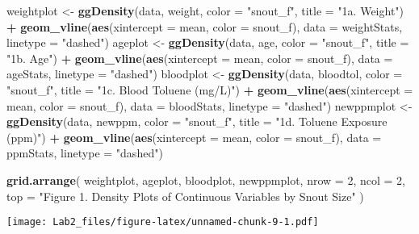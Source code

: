 \documentclass[
]{article}
\newenvironment{Shaded}{\begin{snugshade}}{\end{snugshade}}
\newcommand{\AttributeTok}[1]{\textcolor[rgb]{0.13,0.29,0.53}{#1}}
\newcommand{\DecValTok}[1]{\textcolor[rgb]{0.00,0.00,0.81}{#1}}
\newcommand{\FunctionTok}[1]{\textcolor[rgb]{0.13,0.29,0.53}{\textbf{#1}}}
\newcommand{\NormalTok}[1]{#1}
\newcommand{\OtherTok}[1]{\textcolor[rgb]{0.56,0.35,0.01}{#1}}
\newcommand{\SpecialCharTok}[1]{\textcolor[rgb]{0.81,0.36,0.00}{\textbf{#1}}}
\newcommand{\StringTok}[1]{\textcolor[rgb]{0.31,0.60,0.02}{#1}}
\begin{document}
\begin{Shaded}
\begin{Highlighting}[]
\NormalTok{weightplot }\OtherTok{\textless{}{-}} \FunctionTok{ggDensity}\NormalTok{(data, weight, }\AttributeTok{color =} \StringTok{"snout\_f"}\NormalTok{, }\AttributeTok{title =} \StringTok{"1a. Weight"}\NormalTok{) }\SpecialCharTok{+} \FunctionTok{geom\_vline}\NormalTok{(}\FunctionTok{aes}\NormalTok{(}\AttributeTok{xintercept =}\NormalTok{ mean, }\AttributeTok{color =}\NormalTok{ snout\_f), }\AttributeTok{data =}\NormalTok{ weightStats, }\AttributeTok{linetype =} \StringTok{"dashed"}\NormalTok{)}
\NormalTok{ageplot }\OtherTok{\textless{}{-}} \FunctionTok{ggDensity}\NormalTok{(data, age, }\AttributeTok{color =} \StringTok{"snout\_f"}\NormalTok{, }\AttributeTok{title =} \StringTok{"1b. Age"}\NormalTok{) }\SpecialCharTok{+} \FunctionTok{geom\_vline}\NormalTok{(}\FunctionTok{aes}\NormalTok{(}\AttributeTok{xintercept =}\NormalTok{ mean, }\AttributeTok{color =}\NormalTok{ snout\_f), }\AttributeTok{data =}\NormalTok{ ageStats, }\AttributeTok{linetype =} \StringTok{"dashed"}\NormalTok{)}
\NormalTok{bloodplot }\OtherTok{\textless{}{-}} \FunctionTok{ggDensity}\NormalTok{(data, bloodtol, }\AttributeTok{color =} \StringTok{"snout\_f"}\NormalTok{, }\AttributeTok{title =} \StringTok{"1c. Blood Toluene (mg/L)"}\NormalTok{) }\SpecialCharTok{+} \FunctionTok{geom\_vline}\NormalTok{(}\FunctionTok{aes}\NormalTok{(}\AttributeTok{xintercept =}\NormalTok{ mean, }\AttributeTok{color =}\NormalTok{ snout\_f), }\AttributeTok{data =}\NormalTok{ bloodStats, }\AttributeTok{linetype =} \StringTok{"dashed"}\NormalTok{)}
\NormalTok{newppmplot }\OtherTok{\textless{}{-}} \FunctionTok{ggDensity}\NormalTok{(data, newppm, }\AttributeTok{color =} \StringTok{"snout\_f"}\NormalTok{, }\AttributeTok{title =} \StringTok{"1d. Toluene Exposure (ppm)"}\NormalTok{) }\SpecialCharTok{+} \FunctionTok{geom\_vline}\NormalTok{(}\FunctionTok{aes}\NormalTok{(}\AttributeTok{xintercept =}\NormalTok{ mean, }\AttributeTok{color =}\NormalTok{ snout\_f), }\AttributeTok{data =}\NormalTok{ ppmStats, }\AttributeTok{linetype =} \StringTok{"dashed"}\NormalTok{)}

\FunctionTok{grid.arrange}\NormalTok{(}
\NormalTok{  weightplot, ageplot, bloodplot, newppmplot,}
  \AttributeTok{nrow =} \DecValTok{2}\NormalTok{, }\AttributeTok{ncol =} \DecValTok{2}\NormalTok{,}
  \AttributeTok{top =} \StringTok{"Figure 1. Density Plots of Continuous Variables by Snout Size"}
\NormalTok{)}
\end{Highlighting}
\end{Shaded}

\texttt{[image: Lab2\_files/figure-latex/unnamed-chunk-9-1.pdf]}
\end{document}
